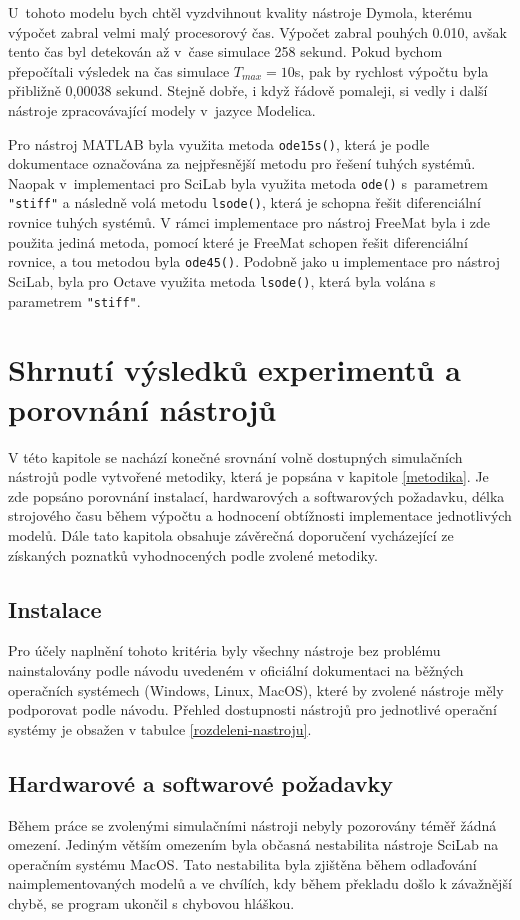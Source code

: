 U~tohoto modelu bych chtěl vyzdvihnout kvality nástroje Dymola, kterému výpočet zabral velmi malý procesorový čas. Výpočet zabral pouhých 0.010, avšak tento čas byl detekován až v~čase simulace 258 sekund. Pokud bychom přepočítali výsledek na čas simulace $T_{max} = 10$s, pak by rychlost výpočtu byla přibližně 0,00038 sekund. Stejně dobře, i když řádově pomaleji, si vedly i další nástroje zpracovávající modely v~jazyce Modelica.

Pro nástroj MATLAB byla využita metoda \texttt{ode15s()}, která je podle dokumentace \cite{MATLAB:2010} označována za nejpřesnější metodu pro řešení tuhých systémů. Naopak v~implementaci pro SciLab byla využita metoda \texttt{ode()} s~parametrem \texttt{"stiff"} a následně volá metodu \texttt{lsode()}, která je schopna řešit diferenciální rovnice tuhých systémů. V rámci implementace pro nástroj FreeMat byla i zde použita jediná metoda, pomocí které je FreeMat schopen řešit diferenciální rovnice, a tou metodou byla \texttt{ode45()}. Podobně jako u implementace pro nástroj SciLab, byla pro Octave využita metoda \texttt{lsode()}, která byla volána s parametrem \texttt{"stiff"}.

\section{Shrnutí výsledků experimentů a porovnání nástrojů}
\label{shrnuti}

V této kapitole se nachází konečné srovnání volně dostupných simulačních nástrojů podle vytvořené metodiky, která je popsána v kapitole \ref{metodika}. Je zde popsáno porovnání instalací, hardwarových a softwarových požadavku, délka strojového času během výpočtu a hodnocení obtížnosti implementace jednotlivých modelů. Dále tato kapitola obsahuje závěrečná doporučení vycházející ze získaných poznatků vyhodnocených podle zvolené metodiky.

\subsection*{Instalace}
Pro účely naplnění tohoto kritéria byly všechny nástroje bez problému nainstalovány podle návodu uvedeném v oficiální dokumentaci na běžných operačních systémech (Windows, Linux, MacOS), které by zvolené nástroje měly podporovat podle návodu. Přehled dostupnosti nástrojů pro jednotlivé operační systémy je obsažen v tabulce \ref{rozdeleni-nastroju}.
\subsection*{Hardwarové a softwarové požadavky}
Během práce se zvolenými simulačními nástroji nebyly pozorovány téměř žádná omezení. Jediným větším omezením byla občasná nestabilita nástroje SciLab na operačním systému MacOS. Tato nestabilita byla zjištěna během odlaďování naimplementovaných modelů a ve chvílích, kdy během překladu došlo k závažnější chybě, se program ukončil s chybovou hláškou.
